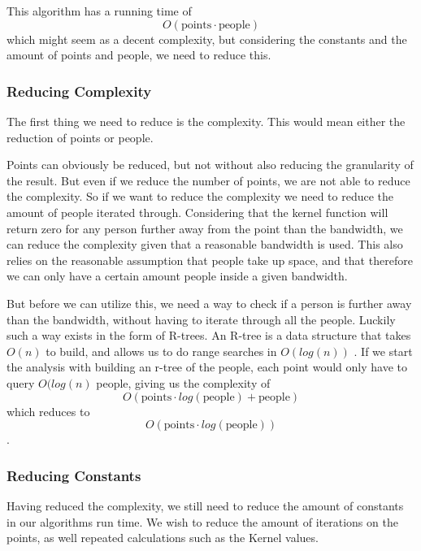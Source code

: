 This algorithm has a running time of $$O(\text{points} \cdot \text{people})$$  which might seem as a decent complexity, but considering the constants and the amount of points and people, we need to reduce this.


\subsubsection{Reducing Complexity}

The first thing we need to reduce is the complexity. This would mean either the reduction of points or people.

Points can obviously be reduced, but not without also reducing the granularity of the result. But even if we reduce the number of points, we are not able to reduce the complexity. So if we want to reduce the complexity we need to reduce the amount of people iterated through. Considering that the kernel function will return zero for any person further away from the point than the bandwidth, we can reduce the complexity given that a reasonable bandwidth is used. This also relies on the reasonable assumption that people take up space, and that therefore we can only have a certain amount people inside a given bandwidth.

But before we can utilize this, we need a way to check if a person is further away than the bandwidth, without having to iterate through all the people. Luckily such a way exists in the form of R-trees. An R-tree is a data structure that takes $O(n)$ to build, and allows us to do range searches in $O(log(n))$ \cite{rtree}. If we start the analysis with building an r-tree of the people, each point would only have to query $O(log(n)$ people, giving us the complexity of $$O(\text{points} \cdot log(\text{people}) + \text{people})$$ which reduces to $$O(\text{points} \cdot log(\text{people}))$$.



\subsubsection{Reducing Constants}

Having reduced the complexity, we still need to reduce the amount of constants in our algorithms run time. We wish to reduce the amount of iterations on the points, as well repeated calculations such as the Kernel values.


